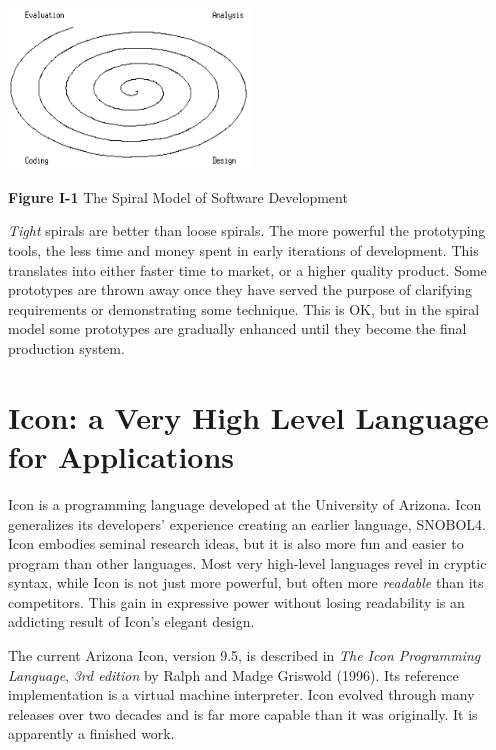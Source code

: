 \begin{center}
\includegraphics[width=2.5402in,height=1.6799in]{ub-img/ub-img4.png}
\end{center}

{\sffamily\bfseries Figure I-1}
{\sffamily The Spiral Model of Software Development}

\bigskip

\textit{Tight} spirals are better than loose spirals. The more powerful
the prototyping tools, the less time and money spent in early
iterations of development. This translates into either faster
time to market, or a higher quality product. Some prototypes are thrown
away once they have served the purpose of clarifying requirements or
demonstrating some technique. This is OK, but in the spiral model some
prototypes are gradually enhanced until they become the final
production system.

\section{Icon: a Very High Level Language for Applications}

Icon is a programming language developed
at the University of Arizona. Icon generalizes its developers' experience
creating an earlier language, SNOBOL4. Icon
embodies seminal research ideas, but it is also more fun and
easier to program than other languages.  Most very high-level
languages revel in cryptic syntax, while Icon
is not just more powerful, but often more
\textit{readable} than its competitors. This
gain in expressive power without losing readability is an
addicting result of Icon's elegant design.

The current Arizona Icon, version 9.5, is described in
\textit{The Icon Programming Language}, \textit{3rd edition} by Ralph
and Madge Griswold (1996). Its reference implementation is a
virtual machine interpreter. Icon evolved through many releases
over two decades and is far more capable than it was originally. It is
apparently a finished work.

